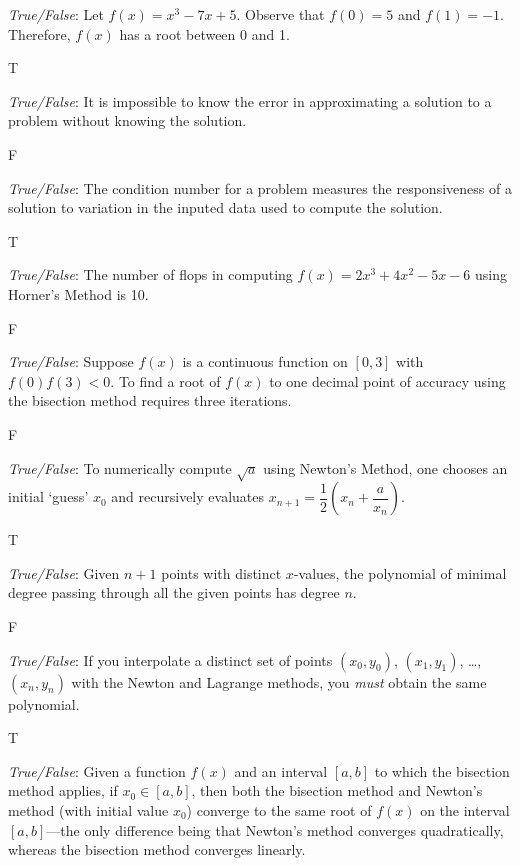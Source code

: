 \documentclass[11pt,letterpaper]{article}
\begin{document}
\thispagestyle{title}


\quizsol \textit{True/False}: Let $f(x)= x^3 - 7x + 5$. Observe that $f(0)= 5$ and $f(1)= -1$. Therefore, $f(x)$ has a root between 0 and 1. \pspace

\sol T


\quizsol \textit{True/False}: It is impossible to know the error in approximating a solution to a problem without knowing the solution. \pspace

\sol F

\quizsol \textit{True/False}: The condition number for a problem measures the responsiveness of a solution to variation in the inputed data used to compute the solution. \pspace

\sol T


\quizsol \textit{True/False}: The number of flops in computing $f(x)= 2x^3 + 4x^2 - 5x - 6$ using Horner's Method is 10. \pspace

\sol F


\quizsol \textit{True/False}: Suppose $f(x)$ is a continuous function on $[0, 3]$ with $f(0)f(3) < 0$. To find a root of $f(x)$ to one decimal point of accuracy using the bisection method requires three iterations. \pspace

\sol F



\quizsol \textit{True/False}: To numerically compute $\sqrt{a}$ using Newton's Method, one chooses an initial `guess' $x_0$ and recursively evaluates $x_{n+1}= \dfrac{1}{2} \left( x_n + \dfrac{a}{x_n} \right)$.

T


\quizsol \textit{True/False}: Given $n + 1$ points with distinct $x$-values, the polynomial of minimal degree passing through all the given points has degree $n$.

F



\quizsol \textit{True/False}: If you interpolate a distinct set of points $(x_0, y_0)$, $(x_1, y_1)$, \ldots, $(x_n, y_n)$ with the Newton and Lagrange methods, you \textit{must} obtain the same polynomial. \pspace

T 



\quizsol \textit{True/False}: Given a function $f(x)$ and an interval $[a, b]$ to which the bisection method applies, if $x_0 \in [a, b]$, then both the bisection method and Newton's method (with initial value $x_0$) converge to the same root of $f(x)$ on the interval $[a, b]$---the only difference being that Newton's method converges quadratically, whereas the bisection method converges linearly. \pspace
\end{document}
